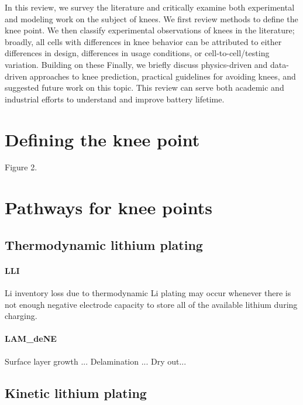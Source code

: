 \documentclass{article}
\begin{document}
In this review, we survey the literature and critically examine both experimental and modeling work on the subject of knees. We first review methods to define the knee point. We then classify experimental observations of knees in the literature; broadly, all cells with differences in knee behavior can be attributed to either differences in design, differences in usage conditions, or cell-to-cell/testing variation. Building on these Finally, we briefly discuss physics-driven and data-driven approaches to knee prediction, practical guidelines for avoiding knees, and suggested future work on this topic. This review can serve both academic and industrial efforts to understand and improve battery lifetime.

\section{Defining the knee point}

Figure 2.

\section{Pathways for knee points}

\subsection{Thermodynamic lithium plating}
\paragraph{LLI}
Li inventory loss due to thermodynamic Li plating may occur whenever there is not enough negative electrode capacity to store all of the available lithium during charging.
\paragraph{LAM_{deNE}}
Surface layer growth ...
Delamination ...
Dry out...


\subsection{Kinetic lithium plating}
\end{document}
